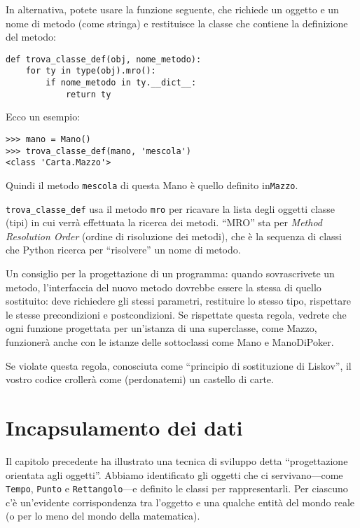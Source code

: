 \documentclass[10pt]{book}
\begin{document}
In alternativa, potete usare la funzione seguente, che richiede un oggetto e un nome di metodo (come stringa) e restituisce la classe che contiene la definizione del metodo:

\begin{verbatim}
def trova_classe_def(obj, nome_metodo):
    for ty in type(obj).mro():
        if nome_metodo in ty.__dict__:
            return ty
\end{verbatim}
%
Ecco un esempio:

\begin{verbatim}
>>> mano = Mano()
>>> trova_classe_def(mano, 'mescola')
<class 'Carta.Mazzo'>
\end{verbatim}
%
Quindi il metodo {\tt mescola} di questa Mano è quello definito in{\tt Mazzo}.

\verb"trova_classe_def" usa il metodo {\tt mro} per ricavare la lista degli oggetti classe (tipi) in cui verrà effettuata la ricerca dei metodi.  ``MRO'' sta per {\em Method Resolution Order} (ordine di risoluzione dei metodi), che è la sequenza di classi che Python ricerca per ``risolvere'' un nome di metodo.

Un consiglio per la progettazione di un programma: quando sovrascrivete un metodo, l'interfaccia del nuovo metodo dovrebbe essere la stessa di quello sostituito: deve richiedere gli stessi parametri, restituire lo stesso tipo, rispettare le stesse precondizioni e postcondizioni. Se rispettate questa regola, vedrete che ogni funzione progettata per un'istanza di una superclasse, come Mazzo, funzionerà anche con le istanze delle sottoclassi come Mano e ManoDiPoker.

Se violate questa regola, conosciuta come ``principio di sostituzione di Liskov'', il vostro codice crollerà come (perdonatemi) un castello di carte.

\section{Incapsulamento dei dati}

Il capitolo precedente ha illustrato una tecnica di sviluppo detta
``progettazione orientata agli oggetti''.  Abbiamo identificato gli oggetti che ci servivano---come {\tt Tempo}, {\tt Punto} e {\tt Rettangolo}---e definito le classi per rappresentarli. Per ciascuno c'è un'evidente corrispondenza tra l'oggetto e una qualche entità del mondo reale (o per lo meno del mondo della matematica).
\end{document}
